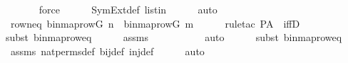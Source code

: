 \begin{isabellebody}
\ \ \ \ \ \isamarkupfalse%
\ force\isanewline
\ \ \ \ \isamarkupfalse%
\ SymExt{\isacharunderscore}{\kern0pt}def\ listin\isanewline
\ \ \ \ \isamarkupfalse%
\ auto\isanewline
\ \ \isamarkupfalse%
\ \isamarkupfalse%
\ rowneq{\isacharcolon}{\kern0pt}\ {\isachardoublequoteopen}binmap{\isacharunderscore}{\kern0pt}row{\isacharparenleft}{\kern0pt}G{\isacharcomma}{\kern0pt}\ n{\isacharparenright}{\kern0pt}\ {\isasymnoteq}\ binmap{\isacharunderscore}{\kern0pt}row{\isacharparenleft}{\kern0pt}G{\isacharcomma}{\kern0pt}\ m{\isacharparenright}{\kern0pt}{\isachardoublequoteclose}\ \isanewline
\ \ \ \ \isamarkupfalse%
{\isacharparenleft}{\kern0pt}rule{\isacharunderscore}{\kern0pt}tac\ P{\isacharequal}{\kern0pt}{\isachardoublequoteopen}{\isacharquery}{\kern0pt}A{\isachardoublequoteclose}\ \ iffD{}{\isacharparenright}{\kern0pt}\isanewline
\ \ \ \ \ \isamarkupfalse%
{\isacharparenleft}{\kern0pt}subst\ binmap{\isacharunderscore}{\kern0pt}row{\isacharunderscore}{\kern0pt}eq{\isacharparenright}{\kern0pt}\isanewline
\ \ \ \ \isamarkupfalse%
\ assms\ \ \isanewline
\ \ \ \ \ \ \ \isamarkupfalse%
\ auto{\isacharbrackleft}{\kern0pt}{}{\isacharbrackright}{\kern0pt}\isanewline
\ \ \ \ \ \isamarkupfalse%
{\isacharparenleft}{\kern0pt}subst\ binmap{\isacharunderscore}{\kern0pt}row{\isacharunderscore}{\kern0pt}eq{\isacharparenright}{\kern0pt}\isanewline
\ \ \ \ \isamarkupfalse%
\ assms\ nat{\isacharunderscore}{\kern0pt}perms{\isacharunderscore}{\kern0pt}def\ bij{\isacharunderscore}{\kern0pt}def\ inj{\isacharunderscore}{\kern0pt}def\isanewline
\ \ \ \ \isamarkupfalse%
\ auto\isanewline
{}\isamarkupfalse%
%
\endisatagproof
{\isafoldproof}%
%
\isadelimproof
\isanewline
%
\endisadelimproof
\isanewline
{}\isamarkupfalse%
\isanewline
%
\isadelimtheory
%
\endisadelimtheory
%
\isatagtheory
{}\isamarkupfalse%
%
\endisatagtheory
{\isafoldtheory}%
%
\isadelimtheory
%
\endisadelimtheory
%
\end{isabellebody}%
\endinput
